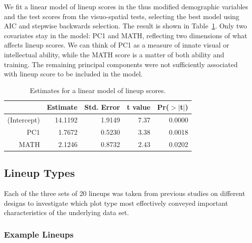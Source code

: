 \documentclass[11pt]{isuthesis}\usepackage[]{graphicx}\usepackage[]{color}
\begin{document}
We fit a linear model of lineup scores in the thus modified demographic variables and the test scores from the visuo-spatial tests, selecting the best model using AIC and stepwise backwards selection. The result is shown in Table~\ref{tab:m1}. Only two covariates stay in the model: PC1 and MATH, reflecting two dimensions of what affects lineup scores. We can think of PC1 as a measure of innate visual or intellectual ability, while the MATH score is a matter of both ability and training. The remaining principal components were not sufficiently associated with lineup score to be included in the model.

\begin{table}[ht]
\centering
\caption{Estimates for a linear model of lineup scores.} 
\label{tab:m1}
\begin{tabular}{rrrrr}
  \hline
 & Estimate & Std. Error & t value & Pr($>$$|$t$|$) \\ 
  \hline
(Intercept) & 14.1192 & 1.9149 & 7.37 & 0.0000 \\ 
  PC1 & 1.7672 & 0.5230 & 3.38 & 0.0018 \\ 
  MATH & 2.1246 & 0.8732 & 2.43 & 0.0202 \\ 
   \hline
\end{tabular}
\end{table}

\subsection{Lineup Types}
Each of the three sets of 20 lineups was taken from previous studies on different designs to investigate which plot type most effectively conveyed important characteristics of the underlying data set. 

\subsubsection{Example Lineups}
\end{document}

